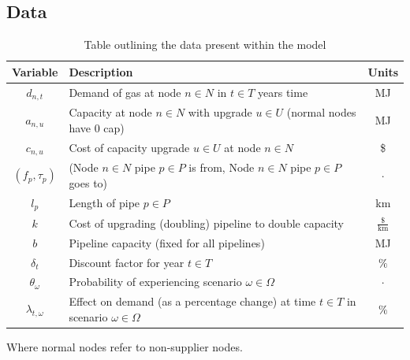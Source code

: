 \documentclass{article}
\begin{document}
\subsection{Data}
\bigskip
\renewcommand\baselinestretch{1.5}
\begin{table}[htb]
    \centering
    \color{black}
        \begin{tabular}{|c:l:c|}
        \hline
        \textbf{Variable} & \textbf{Description} & \textbf{Units} \\
        \hline
        \(d_{n,t}\) & Demand of gas at node \(n\in N\) in \(t \in T\) years time & MJ \\ \hdashline
        \(a_{n,u}\) & Capacity at node \(n \in N\) with upgrade \(u \in U\) (normal nodes have 0 cap) & MJ \\ \hdashline
        \(c_{n,u}\) & Cost of capacity upgrade \(u \in U\) at node \(n \in N\)  & \$ \\ \hdashline
        \((f_p, \tau_p)\) & (Node \(n\in N\) pipe \(p \in P\) is from, Node \(n \in N\) pipe \(p \in P\) goes to) & \(\cdot\) \\ \hdashline
        \(l_p\) & Length of pipe \(p \in P\) & km \\ \hdashline
        \(k\) & Cost of upgrading (doubling) pipeline to double capacity & \(\frac{\$}{\text{km}}\) \\ \hdashline
        \(b\) & Pipeline capacity (fixed for all pipelines) & MJ \\ \hdashline
        \(\delta_t\) & Discount factor for year \(t \in T\) & \(\%\) \\ \hdashline
        \(\theta_\omega\) & Probability of experiencing scenario \(\omega \in \Omega\) & \(\cdot\) \\ \hdashline
        \(\lambda_{t,\omega}\) & Effect on demand (as a percentage change) at time \(t \in T\) in scenario \(\omega \in \Omega\) & \(\%\) \\
        \hline
    \end{tabular}
    \caption{Table outlining the data present within the model}
    \label{tab:data}
\end{table}
Where normal nodes refer to non-supplier nodes.
\renewcommand\baselinestretch{1}
\bigskip
\newpage
\end{document}
